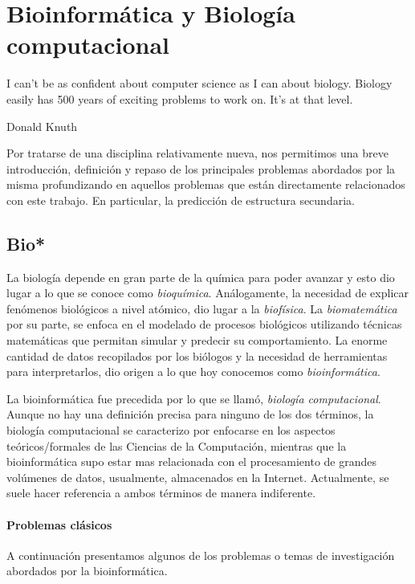 \chapter{Bioinform\'atica y Biolog\'ia computacional}
\label{bioinformatica}
\epigraph{I can't be as confident about computer science as I can about biology.
Biology easily has 500 years of exciting problems to work on. It's at that
level.}%
{Donald Knuth}

Por tratarse de una disciplina relativamente nueva, nos permitimos una breve
introducci\'on, definici\'on y repaso de los principales problemas abordados
por la misma profundizando en aquellos problemas que est\'an directamente
relacionados con este trabajo. En particular, la predicci\'on de estructura
secundaria.

\section{Bio*}

La biolog\'ia depende en gran parte de la qu\'imica para poder avanzar y esto
dio lugar a lo que se conoce como \textit{bioqu\'imica}. An\'alogamente, la
necesidad de explicar fen\'omenos biol\'ogicos a nivel at\'omico, dio lugar a la
\textit{biof\'isica}. La \textit{biomatem\'atica} por su parte, se enfoca en el
modelado de procesos biol\'ogicos utilizando t\'ecnicas matem\'aticas que
permitan simular y predecir su comportamiento. La enorme cantidad de datos
recopilados por los bi\'ologos y la necesidad de herramientas para
interpretarlos, dio origen a lo que hoy conocemos como
\textit{bioinform\'atica}.

La bioinform\'atica fue precedida por lo que se llam\'o, \textit{biolog\'ia
computacional}. Aunque no hay una definici\'on precisa para ninguno de
los dos t\'erminos, la biolog\'ia computacional se caracterizo por enfocarse
en los aspectos te\'oricos/formales de las Ciencias de la Computaci\'on,
mientras que la bioinform\'atica supo estar mas relacionada con el
procesamiento de grandes vol\'umenes de datos, usualmente, almacenados en la
Internet. Actualmente, se suele hacer referencia a ambos t\'erminos de manera
indiferente.

\subsubsection{Problemas cl\'asicos}

A continuaci\'on presentamos algunos de los problemas o temas de investigaci\'on
abordados por la bioinform\'atica.

